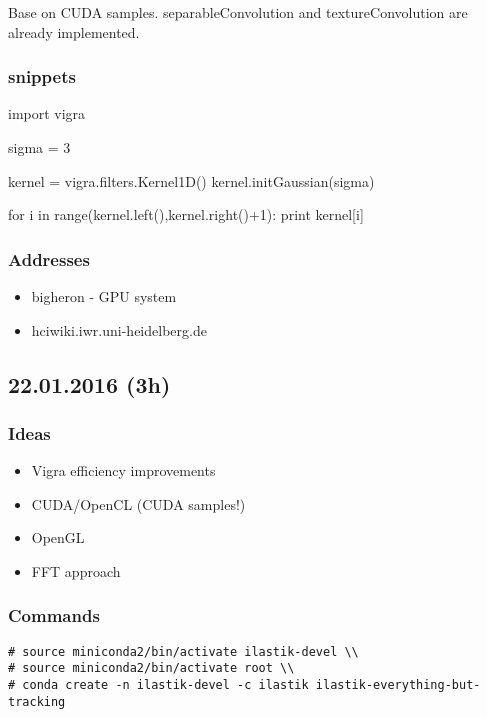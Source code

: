 \documentclass[12pt,a4paper]{article}
\begin{document}
Base on CUDA samples. separableConvolution and textureConvolution are already implemented.

\subsubsection{snippets}
  \begin{python}[caption="print out gaussian 1D kernel"]
    import vigra

    sigma = 3

    kernel = vigra.filters.Kernel1D()
    kernel.initGaussian(sigma)
    
    for i in range(kernel.left(),kernel.right()+1):
      print kernel[i]
  \end{python}

\subsubsection{Addresses}
  \begin{itemize}
    \item bigheron - GPU system
    \item hciwiki.iwr.uni-heidelberg.de
  \end{itemize}


\subsection{22.01.2016 (3h)}

\subsubsection{Ideas}
\begin{itemize}
  \item Vigra efficiency improvements
  \item CUDA/OpenCL (CUDA samples!)
  \item OpenGL
  \item FFT approach
\end{itemize}

\subsubsection{Commands}

\begin{lstlisting}[style=BashInputStyle]
# source miniconda2/bin/activate ilastik-devel \\
# source miniconda2/bin/activate root \\
# conda create -n ilastik-devel -c ilastik ilastik-everything-but-tracking
\end{lstlisting}
\end{document}
